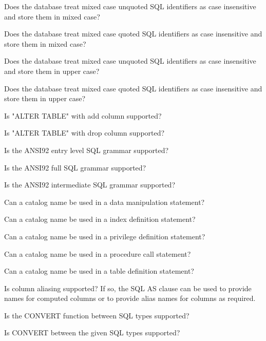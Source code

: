 \begin{description}
Does the database treat mixed case unquoted SQL identifiers as case insensitive and store them in mixed case? 

Does the database treat mixed case quoted SQL identifiers as case insensitive and store them in mixed case? 

Does the database treat mixed case unquoted SQL identifiers as case insensitive and store them in upper case? 

Does the database treat mixed case quoted SQL identifiers as case insensitive and store them in upper case? 

Is "ALTER TABLE" with add column supported? 

Is "ALTER TABLE" with drop column supported? 

Is the ANSI92 entry level SQL grammar supported?

Is the ANSI92 full SQL grammar supported? 

Is the ANSI92 intermediate SQL grammar supported? 

Can a catalog name be used in a data manipulation statement? 

Can a catalog name be used in a index definition statement? 

Can a catalog name be used in a privilege definition statement? 

Can a catalog name be used in a procedure call statement? 

Can a catalog name be used in a table definition statement? 

Is column aliasing supported? 
If so, the SQL AS clause can be used to provide names for computed columns or to provide alias names for columns as required. 

Is the CONVERT function between SQL types supported? 

Is CONVERT between the given SQL types supported? 


\end{description}
